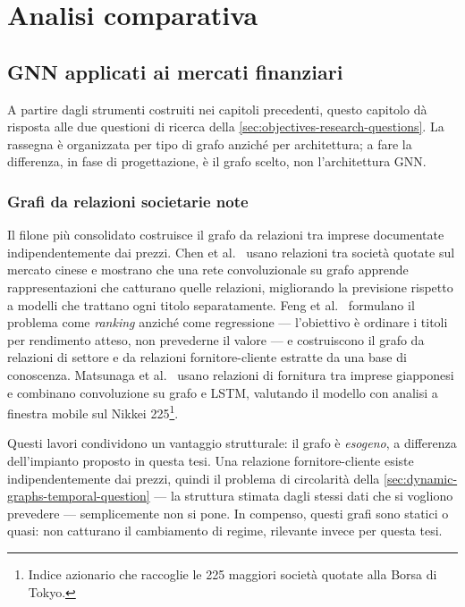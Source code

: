 \chapter{Analisi comparativa}
\label{ch:literature-review}

\section{GNN applicati ai mercati finanziari}
\label{sec:gnn-financial-markets}

A partire dagli strumenti costruiti nei capitoli precedenti, questo capitolo dà risposta alle due questioni di ricerca della \cref{sec:objectives-research-questions}. La rassegna è organizzata per tipo di grafo anziché per architettura; a fare la differenza, in fase di progettazione, è il grafo scelto, non l'architettura GNN.

\subsection{Grafi da relazioni societarie note}

Il filone più consolidato costruisce il grafo da relazioni tra imprese documentate indipendentemente dai prezzi. Chen et al.~\cite{chen2018incorporating} usano relazioni tra società quotate sul mercato cinese e mostrano che una rete convoluzionale su grafo apprende rappresentazioni che catturano quelle relazioni, migliorando la previsione rispetto a modelli che trattano ogni titolo separatamente. Feng et al.~\cite{feng2019temporal} formulano il problema come \emph{ranking} anziché come regressione — l'obiettivo è ordinare i titoli per rendimento atteso, non prevederne il valore — e costruiscono il grafo da relazioni di settore e da relazioni fornitore-cliente estratte da una base di conoscenza. Matsunaga et al.~\cite{matsunaga2019exploring} usano relazioni di fornitura tra imprese giapponesi e combinano convoluzione su grafo e LSTM, valutando il modello con analisi a finestra mobile sul Nikkei 225\footnote{Indice azionario che raccoglie le 225 maggiori società quotate alla Borsa di Tokyo.}.

Questi lavori condividono un vantaggio strutturale: il grafo è \emph{esogeno}, a differenza dell'impianto proposto in questa tesi. Una relazione fornitore-cliente esiste indipendentemente dai prezzi, quindi il problema di circolarità della \cref{sec:dynamic-graphs-temporal-question} — la struttura stimata dagli stessi dati che si vogliono prevedere — semplicemente non si pone. In compenso, questi grafi sono statici o quasi: non catturano il cambiamento di regime, rilevante invece per questa tesi.

